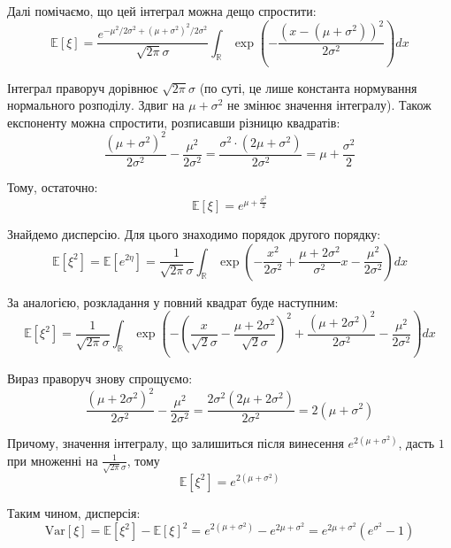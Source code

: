 \documentclass[oneside,solution]{karazin-prob-theory-assign}
\begin{document}
Далі помічаємо, що цей інтеграл можна дещо спростити:
\begin{equation}
    \mathbb{E}[\xi] = \frac{e^{-\mu^2/2\sigma^2 + (\mu+\sigma^2)^2/2\sigma^2}}{\sqrt{2\pi}\sigma}\int_{\mathbb{R}} \exp\left(-\frac{(x-(\mu+\sigma^2))^2}{2\sigma^2}\right)dx
\end{equation}

Інтеграл праворуч дорівнює $\sqrt{2\pi}\sigma$ (по суті, це лише константа нормування нормального розподілу. Здвиг на $\mu+\sigma^2$ не змінює значення інтегралу). Також експоненту можна спростити, розписавши різницю квадратів: 
\begin{equation}
    \frac{(\mu+\sigma^2)^2}{2\sigma^2} - \frac{\mu^2}{2\sigma^2} = \frac{\sigma^2 \cdot (2\mu + \sigma^2)}{2\sigma^2} = \mu + \frac{\sigma^2}{2}
\end{equation}

Тому, остаточно:
\begin{equation}
    \boxed{\mathbb{E}[\xi] = e^{\mu + \frac{\sigma^2}{2}}}
\end{equation}

Знайдемо дисперсію. Для цього знаходимо порядок другого порядку:
\begin{equation}
    \mathbb{E}[\xi^2] = \mathbb{E}[e^{2\eta}] = \frac{1}{\sqrt{2\pi}\sigma}\int_{\mathbb{R}}\exp\left(-\frac{x^2}{2\sigma^2} + \frac{\mu + 2\sigma^2}{\sigma^2}x - \frac{\mu^2}{2\sigma^2}\right)dx
\end{equation}

За аналогією, розкладання у повний квадрат буде наступним:
\begin{equation}
    \mathbb{E}[\xi^2] = \frac{1}{\sqrt{2\pi}\sigma}\int_{\mathbb{R}}\exp\left(-\left(\frac{x}{\sqrt{2}\sigma} - \frac{\mu+2\sigma^2}{\sqrt{2}\sigma}\right)^2 + \frac{(\mu+2\sigma^2)^2}{2\sigma^2} - \frac{\mu^2}{2\sigma^2}\right)dx
\end{equation}

Вираз праворуч знову спрощуємо:
\begin{equation}
    \frac{(\mu+2\sigma^2)^2}{2\sigma^2} - \frac{\mu^2}{2\sigma^2} = \frac{2\sigma^2(2\mu + 2\sigma^2)}{2\sigma^2} = 2(\mu+\sigma^2)
\end{equation}

Причому, значення інтегралу, що залишиться після винесення $e^{2(\mu+\sigma^2)}$, дасть $1$ при множенні на $\frac{1}{\sqrt{2\pi}\sigma}$, тому
\begin{equation}
    \mathbb{E}[\xi^2] = e^{2(\mu+\sigma^2)}
\end{equation}

Таким чином, дисперсія:
\begin{equation}
    \text{Var}[\xi] = \mathbb{E}[\xi^2] - \mathbb{E}[\xi]^2 = e^{2(\mu+\sigma^2)} - e^{2\mu+\sigma^2} = \boxed{e^{2\mu+\sigma^2}(e^{\sigma^2} - 1)}
\end{equation}
\end{document}
